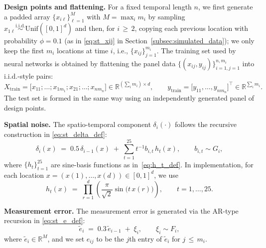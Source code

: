 \documentclass[twoside,11pt]{article}
\begin{document}
\smallskip
\noindent\textbf{Design points and flattening.}
For a fixed temporal length $n$, we first generate a padded array $\{x_{i\ell}\}_{\ell=1}^M$ with $M=\max_i m_i$ by sampling 
$x_{1\ell}\stackrel{\text{i.i.d.}}{\sim}\mathrm{Unif}([0,1]^d)$ and then, for $i\,\ge\, 2$, copying each previous location with probability $\phi=0.1$ 
(as in \eqref{eq:st_xij} in Section~\ref{subsec:simulated_data}); we only keep the first $m_i$ locations at time $i$, i.e., $\{x_{ij}\}_{j=1}^{m_i}$.
The training set used by neural networks is obtained by flattening the panel data
$\{(x_{ij},y_{ij})\}_{i=1,j=1}^{n,m_i}$ into i.i.d.-style pairs:
\[
X_{\mathrm{train}}=\big[x_{11};\ldots;x_{1m_1};x_{21};\ldots;x_{nm_n}\big]\in\mathbb{R}^{(\sum_i m_i)\times d}, 
\qquad 
y_{\mathrm{train}}=\big[y_{11},\ldots,y_{nm_n}\big]^\top\in\mathbb{R}^{\sum_i m_i}.
\]
The test set is formed in the same way using an independently generated panel of design points.

\smallskip
\noindent\textbf{Spatial noise.}
The spatio-temporal component $\delta_i(\cdot)$ follows the recursive construction in \eqref{eq:st_delta_def}:
\begin{equation}\label{eq:st_delta_nn}
\delta_i(x)\;=\;0.5\,\delta_{i-1}(x)\;+\;\sum_{t=1}^{25} t^{-1} b_{i,t}\, h_t(x),
\qquad b_{i,t}\sim G_i,
\end{equation}
where $\{h_t\}_{t=1}^{25}$ are sine-basis functions as in~\eqref{eq:h_t_def}. 
In implementation, for each location $x=(x(1),\ldots,x(d))\in[0,1]^d$, we use
\begin{equation}\label{eq:st_ht}
h_t(x)\;=\;\prod_{r=1}^d \left(\frac{\pi}{\sqrt{2}}\sin\big(t\,x(r)\big)\right),\qquad t=1,\ldots,25.
\end{equation}

\smallskip
\noindent\textbf{Measurement error.}
The measurement error is generated via the AR-type recursion in \eqref{eq:st_e_def}:
\begin{equation}\label{eq:st_e_nn}
\tilde e_i \;=\; 0.3\,\tilde e_{i-1} \;+\; \xi_i,\qquad \xi_i\sim F_i,
\end{equation}
where $\tilde e_i\in\mathbb{R}^M$, and we set $e_{ij}$ to be the $j$th entry of $\tilde e_i$ for $j\,\le\, m_i$.
\end{document}
